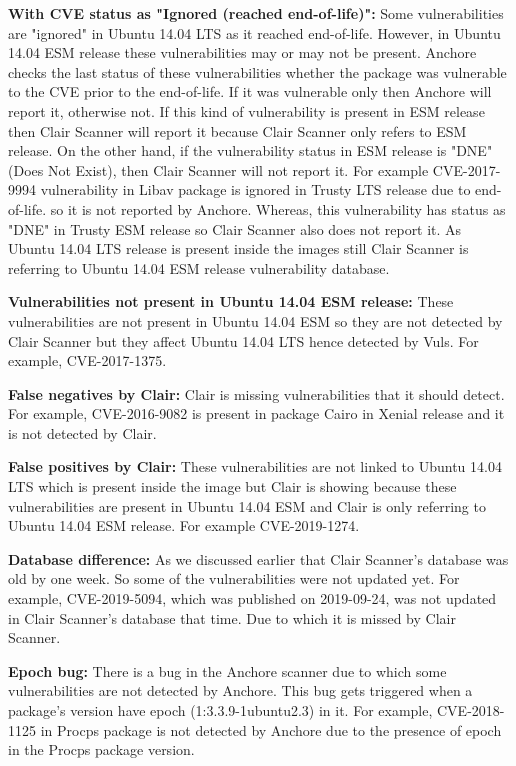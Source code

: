 \documentclass[a4paper,num-refs]{oup-contemporary}
\begin{document}
\textbf{With CVE status as "Ignored (reached end-of-life)":}
Some vulnerabilities are "ignored" in Ubuntu 14.04 LTS as it reached end-of-life. 
However, in Ubuntu 14.04 ESM release these vulnerabilities may or may not be present.
Anchore checks the last status of these vulnerabilities whether the package was vulnerable to the CVE
prior to the end-of-life. If it was vulnerable only then Anchore will report it, otherwise not.
If this kind of vulnerability is present in ESM release then Clair Scanner will report it because Clair Scanner
only refers to ESM release. On the other hand, if the vulnerability
status in ESM release is "DNE" (Does Not Exist), then Clair Scanner will not report it. 
For example CVE-2017-9994 vulnerability in Libav package is ignored in Trusty LTS release due to end-of-life.
so it is not reported by Anchore. Whereas, this vulnerability has status as "DNE" in Trusty ESM
release so Clair Scanner also does not report it. As Ubuntu 14.04 LTS release is present inside the images still
Clair Scanner is referring to Ubuntu 14.04 ESM release vulnerability database.

\textbf{Vulnerabilities not present in Ubuntu 14.04 ESM release:} These vulnerabilities are not present in Ubuntu 14.04 ESM so they 
are not detected by Clair Scanner but they affect Ubuntu 14.04 LTS hence detected by Vuls. For example, CVE-2017-1375.

\textbf{False negatives by Clair:} Clair is missing vulnerabilities that it should detect. For example, CVE-2016-9082 
is present in package Cairo in Xenial release and it is not detected by Clair.

\textbf{False positives by Clair:} These vulnerabilities are not linked to Ubuntu 14.04 LTS which is 
present inside the image but Clair is showing because these vulnerabilities are present in Ubuntu 14.04 ESM and 
Clair is only referring to Ubuntu 14.04 ESM release. For example CVE-2019-1274.

\textbf{Database difference:} As we discussed earlier that Clair Scanner's database was old by one week.
                So some of the vulnerabilities were not updated yet. For example, CVE-2019-5094, which
		was published on 2019-09-24, was not 
		updated in Clair Scanner's database that time. Due to which it is missed by Clair Scanner.

\textbf{Epoch bug:} There is a bug in the Anchore scanner due to which some vulnerabilities are 
		not detected by Anchore. This bug gets triggered when a package’s version have epoch 
		(1:3.3.9-1ubuntu2.3) in it. For example, CVE-2018-1125 in Procps package is not
		detected by Anchore due to the presence of epoch in the Procps package version.
\end{document}
